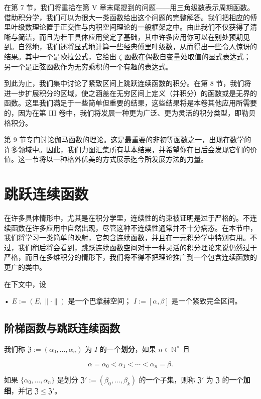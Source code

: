 在第 7 节，我们将重拾在第 V 章末尾提到的问题——用三角级数表示周期函数。借助积分学，我们可以为很大一类函数给出这个问题的完整解答。我们把相应的傅里叶级数理论置于正交性与内积空间理论的一般框架之中。由此我们不仅获得了清晰与简洁，而且为若干具体应用奠定了基础，其中许多应用你可以在别处预期见到。自然地，我们还将显式地计算一些经典傅里叶级数，从而得出一些令人惊讶的结果。其中一个是欧拉公式，它给出 $ \zeta $ 函数在偶数自变量处取值的显式表达式；另一个是正弦函数作为无穷乘积的一个有趣的表达式。

到此为止，我们集中讨论了紧致区间上跳跃连续函数的积分。在第 8 节，我们将进一步扩展积分的区域，使之涵盖在无穷区间上定义（并积分）的函数或是无界的函数。这里我们满足于一些简单但重要的结果，这些结果将是本卷其他应用所需要的，因为在第 III 卷中，我们将发展一种更为广泛、更为灵活的积分类型，即勒贝格积分。

第 9 节专门讨论伽马函数的理论。这是最重要的非初等函数之一，出现在数学的许多领域中。因此，我们力图汇集所有基本结果，并希望你在日后会发现它们的价值。这一节将以一种格外优美的方式展示迄今所发展方法的力量。

\section{跳跃连续函数}

在许多具体情形中，尤其是在积分学里，连续性的约束被证明是过于严格的。不连续函数在许多应用中自然出现，尽管这种不连续性通常并不十分病态。在本节中，我们将学习一类简单的映射，它包含连续函数，并且在一元积分学中特别有用。不过，我们稍后将会看到，跳跃连续函数空间对于一种灵活的积分理论来说仍然过于严格，而且在多维积分的情形下，我们将不得不把理论推广到一个包含连续函数的更广的类中。

在下文中，设

• $ E := (E, \|\cdot\|) $ 是一个巴拿赫空间；
  $ I := [\alpha, \beta] $ 是一个紧致完全区间。

\subsection*{阶梯函数与跳跃连续函数}

我们称 $ \mathfrak{Z} := (\alpha_0, \ldots, \alpha_n) $ 为 $ I $ 的一个\textbf{划分}，如果 $ n \in \mathbb{N}^\times $ 且

\[
\alpha = \alpha_0 < \alpha_1 < \cdots < \alpha_n = \beta.
\]

如果 $ \{\alpha_0, \ldots, \alpha_n\} $ 是划分 $ \mathfrak{Z}' := (\beta_0, \ldots, \beta_k) $ 的一个子集，则称 $ \mathfrak{Z}' $ 为 $ \mathfrak{Z} $ 的一个\textbf{加细}，并记 $ \mathfrak{Z} \le \mathfrak{Z}' $。

